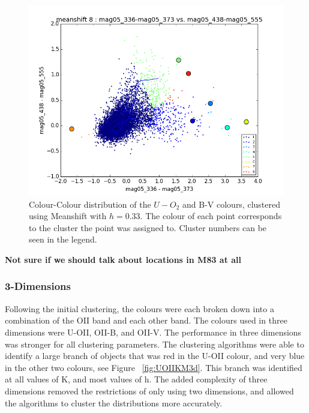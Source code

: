 \begin{figure}
\centering
\includegraphics[width=\linewidth]{figs/successful/meanshift_color_8cl_mag05_336-mag05_373vsmag05_438-mag05_555}
\caption{Colour-Colour distribution of the $U-O_{2}$ and B-V colours, clustered using Meanshift with $h=0.33$. The colour of each point corresponds to the cluster the point was assigned to. Cluster numbers can be seen in the legend.}
\label{fig:UOII2dMS}
\end{figure}

\textbf{Not sure if we should talk about locations in M83 at all}

\subsubsection{3-Dimensions}

Following the initial clustering, the colours were each broken down into a combination of the OII band and each other band.
The colours used in three dimensions were U-OII, OII-B, and OII-V.
The performance in three dimensions was stronger for all clustering parameters.
The clustering algorithms were able to identify a large branch of objects that was red in the U-OII colour, and very blue in the other two colours, see Figure ~\ref{fig:UOIIKM3d}.
This branch was identified at all values of K, and most values of h.
The added complexity of three dimensions removed the restrictions of only using two dimensions, and allowed the algorithms to cluster the distributions more accurately.

